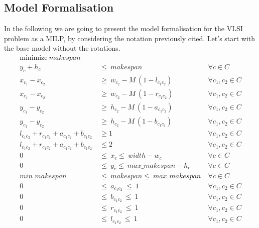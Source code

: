\subsection{Model Formalisation}
    In the following we are going to present the model formalisation for the VLSI problem as a 
    MILP, by considering the notation previously cited. Let's start with the base model without
    the rotations.
\begin{subequations}
    \label{ilp:base}
    \begin{align}
        \label{ilp:base_obj} \text{minimize}\ makespan                                   &\  &\                       \\
        \label{ilp:base_ycons}  y_c + h_c            &\ \leq\ makespan                       &\ \forall c \in C       \\
        \label{ilp:base_diffn1} x_{c_1} - x_{c_2}    &\ \geq\ w_{c_2} - M\ (1 - l_{c_1c_2})  &\ \forall c_1, c_2 \in C\\ 
        \label{ilp:base_diffn2} x_{c_1} - x_{c_2}    &\ \geq\ w_{c_2} - M\ (1 - r_{c_1c_2})  &\ \forall c_1, c_2 \in C\\
        \label{ilp:base_diffn3} y_{c_1} - y_{c_2}    &\ \geq\ h_{c_2} - M\ (1 - a_{c_1c_2})  &\ \forall c_1, c_2 \in C\\ 
        \label{ilp:base_diffn4} y_{c_1} - y_{c_2}    &\ \geq\ h_{c_2} - M\ (1 - b_{c_1c_2})  &\ \forall c_1, c_2 \in C\\
        \label{ilp:base_diffn5} l_{c_1c_2} + r_{c_1c_2} + a_{c_1c_2} + b_{c_1c_2}  &\ \geq 1 &\ \forall c_1, c_2 \in C\\
        \label{ilp:base_diffn6} l_{c_1c_2} + r_{c_1c_2} + a_{c_1c_2} + b_{c_1c_2}  &\ \leq 2 &\ \forall c_1, c_2 \in C\\
        \label{ilp:base_b_x} 0                       &\ \leq\ x_c \leq\ width - w_c          &\ \forall c \in C       \\
        \label{ilp:base_b_y} 0                       &\ \leq\ y_c \leq\ max\_makespan-h_c    &\ \forall c \in C       \\
        \label{ilp:base_b_makspan} min\_makespan     &\ \leq\ makespan \leq\ max\_makespan   &\ \forall c \in C       \\
        \label{ilp:base_b_a} 0\                      &\ \leq\ a_{c_1c_2}\ \leq\ 1            &\ \forall c_1,c_2 \in C \\
        \label{ilp:base_b_b} 0\                      &\ \leq\ b_{c_1c_2}\ \leq\ 1            &\ \forall c_1,c_2 \in C \\
        \label{ilp:base_b_r} 0\                      &\ \leq\ r_{c_1c_2}\ \leq\ 1            &\ \forall c_1,c_2 \in C \\
        \label{ilp:base_b_l} 0\                      &\ \leq\ l_{c_1c_2}\ \leq\ 1            &\ \forall c_1,c_2 \in C
    \end{align}    
\end{subequations}
    
